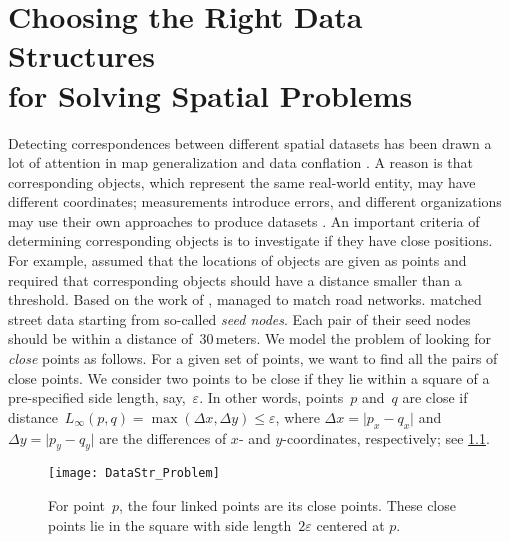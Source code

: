 \chapter %
[Choosing the Right Data Structures for Solving Spatial Problems]
{Choosing the Right Data Structures\\
for Solving Spatial Problems}
\label{chap:DataStr}

Detecting correspondences between different spatial datasets
has been drawn a lot of attention in map generalization 
\parencite[e.g.,][]{Noellenburg2008,Peng2016Admin,Deng2015}
and data conflation 
\parencite[e.g.,][]{Zhang2008Matching,Masuyama2006Tessellation,
	Tong2014Matching,Ruiz2011Conflation}.
A reason is that corresponding objects,
which represent the same real-world entity,
may have different coordinates; 
measurements introduce errors, 
and different organizations may use their own approaches 
to produce datasets \parencite{Beeri2005}.
An important criteria of determining corresponding objects
is to investigate if they have close positions. 
For example, \textcite{Beeri2005} assumed that 
the locations of objects are given as points 
and required that corresponding objects should have a distance 
smaller than a threshold.
Based on the work of \textcite{Beeri2005}, 
\textcite{Safra2013} managed to match road networks.
\textcite{Volz2006} matched street data 
starting from so-called \emph{seed nodes}.
Each pair of their seed nodes should be 
within a distance of~$30\,$meters.
We model the problem of looking for 
\emph{close} points as follows.
For a given set of points,
we want to find all the pairs of close points. 
We consider two points to be close 
if they lie within a square of a pre-specified 
side length, say,~$\varepsilon$. 
In other words, points~$p$ and~$q$ are close 
if distance~$L_{\infty }(p,q)=\max (\Delta x,\Delta y)
\le \varepsilon$, where 
$\Delta x=\vert p_{x}-q_{x}\vert $ and 
$\Delta y=\vert p_{y}-q_{y}\vert$
are the differences of $x$- and $y$-coordinates, respectively;
see \fig\ref{fig:DataStr_Problem}.

\begin{figure}[tb]
\centering
\texttt{[image: DataStr\_Problem]}
\caption{For point~$p$, the four linked points are 
	its close points.
	These close points lie in the square 
	with side length~$2 \varepsilon$ centered at $p$.}
\label{fig:DataStr_Problem}
\end{figure}

